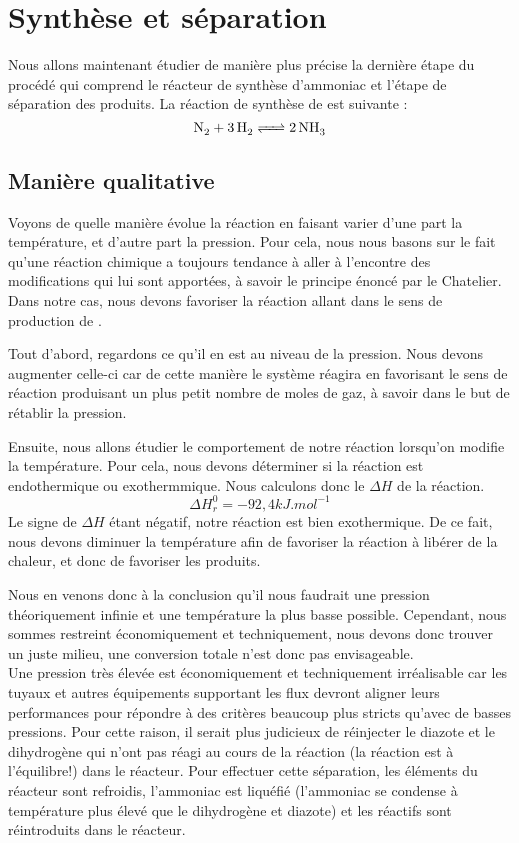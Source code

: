 \documentclass[10pt,a4paper]{article}
\begin{document}
\section{Synthèse  et séparation}

Nous allons maintenant étudier de manière plus précise la dernière étape du procédé qui comprend le réacteur de synthèse d’ammoniac et l'étape de séparation des produits.
La réaction de synthèse de  est suivante :
$$ \ce{N_2 + 3H2 <=> 2NH3}$$

\subsection{Manière qualitative}

Voyons de quelle manière évolue la réaction en faisant varier d'une part la température, et d'autre part la pression. Pour cela, nous nous basons sur le fait qu'une réaction chimique a toujours tendance à   aller à l'encontre des modifications qui lui sont apportées, à savoir le principe énoncé par le Chatelier. Dans notre cas, nous devons favoriser la réaction allant dans le sens de production de .

Tout d'abord, regardons ce qu'il en est au niveau de la pression. Nous devons augmenter celle-ci car de cette manière le système réagira en favorisant le sens de réaction produisant un plus petit nombre de moles de gaz, à savoir  dans le but de rétablir la pression. 

Ensuite, nous allons étudier le comportement de notre réaction lorsqu'on modifie la température. Pour cela, nous devons déterminer si la réaction est endothermique ou exothermmique. Nous calculons donc le $\Delta H$  de la réaction. $$\Delta H^0_r = \unit{-92,4}{kJ.mol^{-1}}$$
Le signe de $\Delta H$ étant négatif, notre réaction est bien exothermique. De ce fait, nous devons diminuer la température afin de favoriser la réaction à libérer de la chaleur, et donc de favoriser les produits.

Nous en venons donc à la conclusion qu'il nous faudrait une pression théoriquement infinie et une température la plus basse possible. Cependant, nous sommes restreint économiquement et techniquement, nous devons donc trouver un juste milieu, une conversion totale n'est donc pas envisageable. 
\\

Une pression très élevée est économiquement et techniquement irréalisable car les tuyaux et autres équipements supportant les flux devront aligner leurs performances pour répondre à des critères beaucoup plus stricts qu'avec de basses pressions.
Pour cette raison, il serait plus judicieux de réinjecter  le diazote et le dihydrogène qui n'ont pas réagi au cours de la réaction (la réaction est à l'équilibre!) dans le réacteur. Pour effectuer cette séparation, les éléments du réacteur sont refroidis, l'ammoniac est liquéfié (l'ammoniac se condense à température plus élevé que le dihydrogène et diazote) et les réactifs sont réintroduits dans le réacteur.
\end{document}
